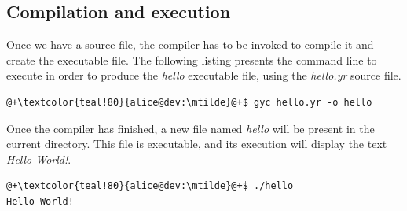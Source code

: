 \subsection{Compilation and execution}

Once we have a source file, the compiler has to be invoked to compile it and
create the executable file. The following listing presents the command line to
execute in order to produce the \textit{hello} executable file, using the
\textit{hello.yr} source file.

\begin{lstlisting}[style=bashVerb, escapechar=@+]
@+\textcolor{teal!80}{alice@dev:\mtilde}@+$ gyc hello.yr -o hello
\end{lstlisting}

Once the compiler has finished, a new file named \textit{hello} will be present
in the current directory. This file is executable, and its execution will
display the text \textit{Hello World!}.

\begin{lstlisting}[style=bashVerb, escapechar=@+]
@+\textcolor{teal!80}{alice@dev:\mtilde}@+$ ./hello
Hello World!
\end{lstlisting}


\vfill
\pagebreak
